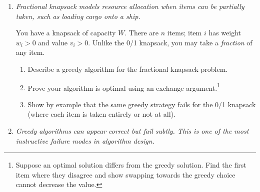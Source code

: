 \documentclass[9pt]{book}
\begin{document}
\begin{enumerate}[label=\arabic*.]
\item \textit{Fractional knapsack models resource allocation when items can be partially taken, such as loading cargo onto a ship.}

You have a knapsack of capacity $W$. There are $n$ items; item $i$ has weight $w_i > 0$ and value $v_i > 0$. Unlike the 0/1 knapsack, you may take a \emph{fraction} of any item.

\begin{enumerate}
    \item Describe a greedy algorithm for the fractional knapsack problem.
    \item Prove your algorithm is optimal using an exchange argument.\footnote{Suppose an optimal solution differs from the greedy solution. Find the first item where they disagree and show swapping towards the greedy choice cannot decrease the value.}
    \item Show by example that the same greedy strategy fails for the 0/1 knapsack (where each item is taken entirely or not at all).
\end{enumerate}




\item \textit{Greedy algorithms can appear correct but fail subtly. This is one of the most instructive failure modes in algorithm design.}


\end{enumerate}
\end{document}
